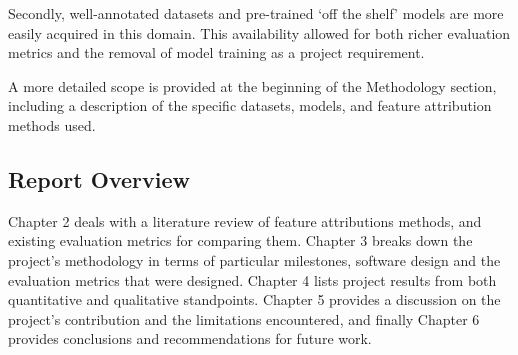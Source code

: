 \documentclass[main]{subfiles}
\begin{document}
Secondly, well-annotated datasets and pre-trained `off the shelf' models are more easily acquired in this domain. This availability allowed for both richer evaluation metrics and the removal of model training as a project requirement.

A more detailed scope is provided at the beginning of the Methodology section, including a description of the specific datasets, models, and feature attribution methods used.

\newpage

\subsection*{Report Overview}

Chapter 2 deals with a literature review of feature attributions methods, and existing evaluation metrics for comparing them. Chapter 3 breaks down the project's methodology in terms of particular milestones, software design and the evaluation metrics that were designed. Chapter 4 lists project results from both quantitative and qualitative standpoints. Chapter 5 provides a discussion on the project's contribution and the limitations encountered, and finally Chapter 6 provides conclusions and recommendations for future work. 
\end{document}
